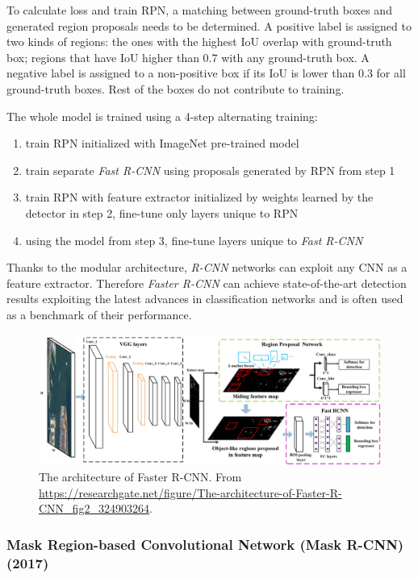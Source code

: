  To calculate loss and train RPN, a matching between ground-truth boxes and generated region proposals needs to be determined. A positive label is assigned to two kinds of regions: the ones with the highest IoU overlap with ground-truth box; regions that have IoU higher than 0.7 with any ground-truth box. A negative label is assigned to a non-positive box if its IoU is lower than 0.3 for all ground-truth boxes. Rest of the boxes do not contribute to training. 
 
 The whole model is trained using a 4-step alternating training:
 
 \begin{enumerate}
     \item train RPN initialized with ImageNet pre-trained model
     \item train separate \textit{Fast R-CNN} using proposals generated by RPN from step 1
     \item train RPN with feature extractor initialized by weights learned by the detector in step 2, fine-tune only layers unique to RPN
     \item using the model from step 3, fine-tune layers unique to \textit{Fast R-CNN}
 \end{enumerate}

Thanks to the modular architecture, \textit{R-CNN} networks can exploit any CNN as a feature extractor.  Therefore \textit{Faster R-CNN} can achieve state-of-the-art detection results exploiting the latest advances in classification networks and is often used as a benchmark of their performance.
     

 \begin{figure}
     \centering
     \includegraphics[width=\textwidth]{img/fasterrcnn}
     \caption{The architecture of Faster R-CNN. From \url{https://researchgate.net/figure/The-architecture-of-Faster-R-CNN\_fig2\_324903264}.}
     \label{fig:fasterrcnn}
 \end{figure}

\subsubsection{Mask Region-based Convolutional Network (Mask R-CNN) (2017)}
\cite{bib:maskrcnn}

